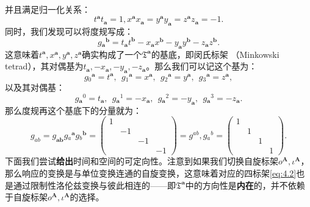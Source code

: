 并且满足归一化关系：
\begin{equation*}
	t^{\boldsymbol{a}} t_{\boldsymbol{a}} =1,x^{\boldsymbol{a}} x_{\boldsymbol{a}} =y^{\boldsymbol{a}} y_{\boldsymbol{a}} =z^{\boldsymbol{a}} z_{\boldsymbol{a}} =-1.
\end{equation*}
同时，我们发现可以将度规写成：
\begin{equation*}
	g{_{\boldsymbol{a}}}^{\boldsymbol{b}} =t_{\boldsymbol{a}} t^{\boldsymbol{b}} -x_{\boldsymbol{a}} x^{\boldsymbol{b}} -y_{\boldsymbol{a}} y^{\boldsymbol{b}} -z_{\boldsymbol{a}} z^{\boldsymbol{b}} .
\end{equation*}
这意味着$t^{\boldsymbol{a}} ,x^{\boldsymbol{a}} ,y^{\boldsymbol{a}} ,z^{\boldsymbol{a}}$确实构成了一个$\mathfrak{T}^{\boldsymbol{a}}$的基底，即闵氏标架 （Minkowski tetrad），其对偶基为$t_{\boldsymbol{a}} ,-x_{\boldsymbol{a}} ,-y_{\boldsymbol{a}} ,-z_{\boldsymbol{a}}$。那么我们可以记这个基为：
\begin{equation}
	g{_{0}}^{\boldsymbol{a}} =t^{\boldsymbol{a}} ,\ \ g{_{1}}^{\boldsymbol{a}} =x^{\boldsymbol{a}} ,\ \ g{_{2}}^{\boldsymbol{a}} =y^{\boldsymbol{a}} ,\ \ g{_{3}}^{\boldsymbol{a}} =z^{\boldsymbol{a}} ,
	\label{eq:4.3}
\end{equation}
以及其对偶基：
\begin{equation*}
	g{_{\boldsymbol{a}}}^{0} =t_{\boldsymbol{a}} ,\ \ g{_{\boldsymbol{a}}}^{1} =-x_{\boldsymbol{a}} ,\ \ g{_{\boldsymbol{a}}}^{2} =-y_{\boldsymbol{a}} ,\ \ g{_{\boldsymbol{a}}}^{3} =-z_{\boldsymbol{a}} .
\end{equation*}
那么度规再这个基底下的分量就为：
\begin{equation*}
	g_{ab} =g_{\boldsymbol{ab}} g{_{a}}^{\boldsymbol{a}} g{_{b}}^{\boldsymbol{b}} =\begin{pmatrix}
		1 &  &  & \\
		& -1 &  & \\
		&  & -1 & \\
		&  &  & -1
	\end{pmatrix} =g^{ab} ,g{_{a}}^{b} =\begin{pmatrix}
		1 &  &  & \\
		& 1 &  & \\
		&  & 1 & \\
		&  &  & 1
	\end{pmatrix} .
\end{equation*}
下面我们尝试\textbf{给出}时间和空间的可定向性。注意到如果我们切换自旋标架$o^{\boldsymbol{A}} ,\iota ^{\boldsymbol{A}}$，那么响应的变换是与单位变换连通的自旋变换，这意味着对应的四标架\ref{eq:4.2}也是通过限制性洛伦兹变换与彼此相连的——即$\mathfrak{T}^{\boldsymbol{a}}$中的方向性是\textbf{内在}的，并不依赖于自旋标架$o^{\boldsymbol{A}} ,\iota ^{\boldsymbol{A}}$的选择。



